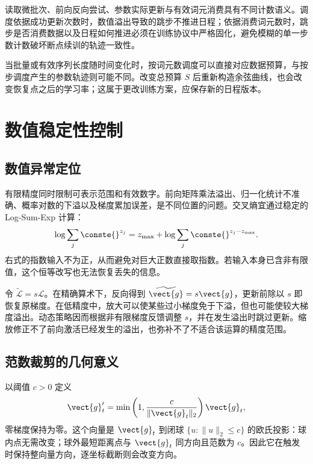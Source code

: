 \documentclass[../textbook.tex]{subfiles}
\begin{document}
\begin{warning}[训练计数与恢复条件]
读取微批次、前向反向尝试、参数实际更新与有效词元消费具有不同计数语义。调度依据成功更新次数时，数值溢出导致的跳步不推进日程；依据消费词元数时，跳步是否消费数据以及日程如何推进必须在训练协议中严格固化，避免模糊的单一步数计数破坏断点续训的轨迹一致性。
\end{warning}

当批量或有效序列长度随时间变化时，按词元数调度可以直接对应数据预算，与按步调度产生的参数轨迹则可能不同。改变总预算 $S$ 后重新构造余弦曲线，也会改变恢复点之后的学习率；这属于更改训练方案，应保存新的日程版本。

\section{数值稳定性控制}

\subsection{数值异常定位}
有限精度同时限制可表示范围和有效数字。前向矩阵乘法溢出、归一化统计不准确、概率对数的下溢以及梯度累加误差，是不同位置的问题。交叉熵宜通过稳定的 Log-Sum-Exp 计算：
\begin{equation}
 \log\sum_j \conste{}^{z_j}=z_{\max}+\log\sum_j \conste{}^{z_j-z_{\max}}.
\end{equation}
右式的指数输入不为正，从而避免对巨大正数直接取指数。若输入本身已含非有限值，这个恒等改写也无法恢复丢失的信息。

令 $\widetilde{\mathcal L}=s\mathcal L$。在精确算术下，反向得到 $\widetilde{\vect{g}}=s\vect{g}$，更新前除以 $s$ 即恢复原梯度。在低精度中，放大可以使某些过小梯度免于下溢，但也可能使较大梯度溢出。动态策略因而根据非有限梯度反馈调整 $s$，并在发生溢出时跳过更新。缩放修正不了前向激活已经发生的溢出，也弥补不了不适合该运算的精度范围。

\subsection{范数裁剪的几何意义}
以阈值 $c>0$ 定义
\begin{equation}
 \vect{g}'_t=\min\left(1,\frac{c}{\|\vect{g}_t\|_2}\right)\vect{g}_t,
 \label{eq:stability-clipping}
\end{equation}
零梯度保持为零。这个向量是 $\vect{g}_t$ 到闭球 $\{u:\|u\|_2\le c\}$ 的欧氏投影：球内点无需改变；球外最短距离点与 $\vect{g}_t$ 同方向且范数为 $c$。因此它在触发时保持整向量方向，逐坐标截断则会改变方向。
\end{document}
